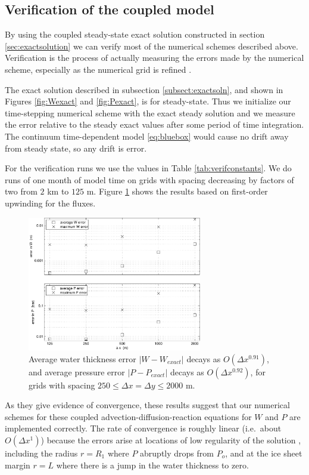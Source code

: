 \documentclass[gmd]{copernicus}   %
\begin{document}
\subsection{Verification of the coupled model}  By using the coupled steady-state exact solution constructed in section \ref{sec:exactsolution} we can verify most of the numerical schemes described above.  Verification is the process of actually measuring the errors made by the numerical scheme, especially as the numerical grid is refined \citep{Wesseling,BLKCB}.

The exact solution described in subsection \ref{subsect:exactsoln}, and shown in Figures \ref{fig:Wexact} and \ref{fig:Pexact}, is for steady-state.  Thus we initialize our time-stepping numerical scheme with the exact steady solution and we measure the error relative to the steady exact values after some period of time integration.  The continuum time-dependent model \eqref{eq:bluebox} would cause no drift away from steady state, so any drift is error.

For the verification runs we use the values in Table \ref{tab:verifconstants}.  We do runs of one month of model time on grids with spacing decreasing by factors of two from $2$ km to $125$ m.  Figure \ref{fig:refineWPpism} shows the results based on first-order upwinding for the fluxes.

\begin{figure}[ht]
\includegraphics[width=3.0in,keepaspectratio=true]{refineWPpism}
\caption{Average water thickness error $|W-W_{exact}|$ decays as $O(\Delta x^{0.91})$, and average pressure error $|P-P_{exact}|$ decays as $O(\Delta x^{0.92})$, for grids with spacing $250 \le \Delta x = \Delta y \le 2000$ m.}
\label{fig:refineWPpism}
\end{figure}

As they give evidence of convergence, these results suggest that our numerical schemes for these coupled advection-diffusion-reaction equations for $W$ and $P$ are implemented correctly.  The rate of convergence is roughly linear (i.e.~about $O(\Delta x^1)$) because the errors arise at locations of low regularity of the solution \citep{BLKCB}, including the radius $r=R_1$ where $P$ abruptly drops from $P_o$, and at the ice sheet margin $r=L$ where there is a jump in the water thickness to zero.
\end{document}
